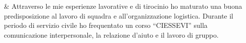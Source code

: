 & Attraverso le mie esperienze lavorative e di tirocinio ho maturato una buona predisposizione al lavoro di squadra e all'organizzazione logistica. Durante il periodo di servizio civile ho frequentato un corso ``CIESSEVI'' sulla comunicazione interpersonale, la relazione d'aiuto e il lavoro di gruppo.\\